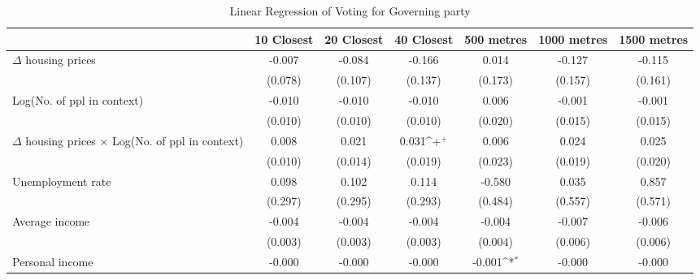 \begin{table}[htbp]\centering
\def\sym#1{\ifmmode^{#1}\else\(^{#1}\)\fi}
\caption{Linear Regression of Voting for Governing party } \label{inddens}
\begin{tabular}{l*{6}{c}}
\hline\hline
                    &\multicolumn{1}{c}{10 Closest}&\multicolumn{1}{c}{20 Closest}&\multicolumn{1}{c}{40 Closest}&\multicolumn{1}{c}{500 metres}&\multicolumn{1}{c}{1000 metres}&\multicolumn{1}{c}{1500 metres}\\
\hline
$\Delta$ housing prices&      -0.007       &      -0.084       &      -0.166       &       0.014       &      -0.127       &      -0.115       \\
                    &     (0.078)       &     (0.107)       &     (0.137)       &     (0.173)       &     (0.157)       &     (0.161)       \\
[1em]
Log(No. of ppl in context)&      -0.010       &      -0.010       &      -0.010       &       0.006       &      -0.001       &      -0.001       \\
                    &     (0.010)       &     (0.010)       &     (0.010)       &     (0.020)       &     (0.015)       &     (0.015)       \\
[1em]
$\Delta$ housing prices $\times$ Log(No. of ppl in context)&       0.008       &       0.021       &       0.031\sym{+}&       0.006       &       0.024       &       0.025       \\
                    &     (0.010)       &     (0.014)       &     (0.019)       &     (0.023)       &     (0.019)       &     (0.020)       \\
[1em]
Unemployment rate   &       0.098       &       0.102       &       0.114       &      -0.580       &       0.035       &       0.857       \\
                    &     (0.297)       &     (0.295)       &     (0.293)       &     (0.484)       &     (0.557)       &     (0.571)       \\
[1em]
Average income      &      -0.004       &      -0.004       &      -0.004       &      -0.004       &      -0.007       &      -0.006       \\
                    &     (0.003)       &     (0.003)       &     (0.003)       &     (0.004)       &     (0.006)       &     (0.006)       \\
[1em]
Personal income     &      -0.000       &      -0.000       &      -0.000       &      -0.001\sym{*}&      -0.000       &      -0.000       \\

\end{tabular}
\end{table}
